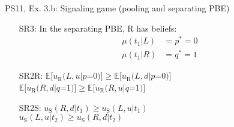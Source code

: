 \begin{frame}{PS11, Ex. 3.b: Signaling game (pooling and separating PBE)}
\begin{multicols}{2}
      \begin{itemize}
        \item[SR3:] In the separating PBE, R has beliefs:\vspace{-10pt}
        \begin{align*}
          \mu(t_1|L)&=p^*=0&\\
          \mu(t_1|R)&=q^*=1
        \end{align*}
        \item[SR2R:] \vspace{-6pt}
                     $\mathbb{E}[u_\text{R}(L,u|p$=$0)]\geq\mathbb{E}[u_\text{R}(L,d|p$=$0)]$\\
                     $\mathbb{E}[u_\text{R}(R,d|q$=$1)]\geq \mathbb{E}[u_\text{R}(R,u|q$=$1)]$
        \item[SR2S:] $u_\text{S}(R,d|t_1)\geq u_\text{S}(L,u|t_1)$\\
                     $u_\text{S}(L,u|t_2)\geq u_\text{S}(R,d|t_2)$
      \end{itemize}
      \vfill\null \columnbreak
      \vfill
    \end{multicols}
\end{frame}
